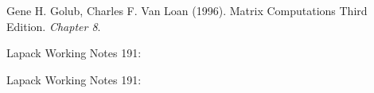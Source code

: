 \documentclass[12pt]{article}
\begin{document}
\begin{thebibliography}{}

Gene H. Golub, Charles F. Van Loan (1996).
\newblock Matrix Computations Third Edition.
\newblock \emph{Chapter 8}.

\newblock Lapack Working Notes 191:

\newblock Lapack Working Notes 191: 

\end{thebibliography}{}
\end{document}
